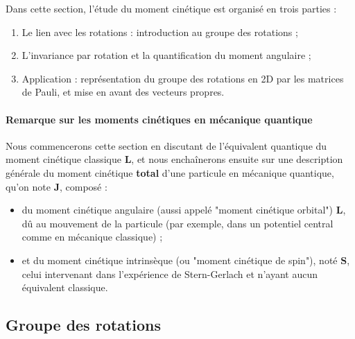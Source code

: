\documentclass[../notesdecours.tex]{subfiles}
\begin{document}
Dans cette section, l'étude du moment cinétique est organisé en trois parties :
\begin{enumerate}
    \item Le lien avec les rotations : introduction au groupe des rotations ;
    \item L'invariance par rotation et la quantification du moment angulaire ;
    \item Application : représentation du groupe des rotations en 2D par les matrices de Pauli, et mise en avant des vecteurs propres.
\end{enumerate} 

\paragraph{Remarque sur les moments cinétiques en mécanique quantique}
Nous commencerons cette section en discutant de l'équivalent quantique du moment cinétique classique $\mathcal{\mathbf{L}}$, et nous enchaînerons ensuite sur une description générale du moment cinétique \textbf{total} d'une particule en mécanique quantique, qu'on note $\mathbf{J}$, composé :
\begin{itemize}
    \item du moment cinétique angulaire (aussi appelé "moment cinétique orbital") $\mathbf{L}$, dû au mouvement de la particule (par exemple, dans un potentiel central comme en mécanique classique) ;
    \item et du moment cinétique intrinsèque (ou "moment cinétique de spin"), noté $\mathbf{S}$, celui intervenant dans l'expérience de Stern-Gerlach et n'ayant aucun équivalent classique.
\end{itemize}


\subsection{Groupe des rotations}
\end{document}
